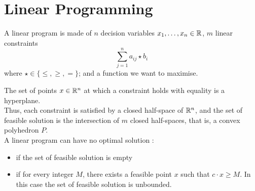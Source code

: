\documentclass[10pt]{cours}
\begin{document}
\section{Linear Programming}
\begin{definition}
    A linear program is made of $n$ decision variables $x_{1}, \ldots, x_{n} \in \mathbb{R}$, $m$ linear constraints
    \[
        \sum_{j = 1}^{n} a_{ij} \star b_{i}
    \]
    where $\star \in \{\leq, \geq, =\}$; and a function we want to maximise. 
\end{definition}
The set of points $x \in \mathbb{R}^{n}$ at which a constraint holds with equality is a hyperplane. \\
Thus, each constraint is satisfied by a closed half-space of $\mathbb{R}^{n}$, and the set of feasible solution is the intersection of $m$ closed half-spaces, that is, a convex polyhedron $P$. \\
A linear program can have no optimal solution : 
\begin{itemize}
    \item if the set of feasible solution is empty
    \item if for every integer $M$, there exists a feasible point $x$ such that $c \cdot x \geq M$. In this case the set of feasible solution is unbounded. 
\end{itemize}
\end{document}
